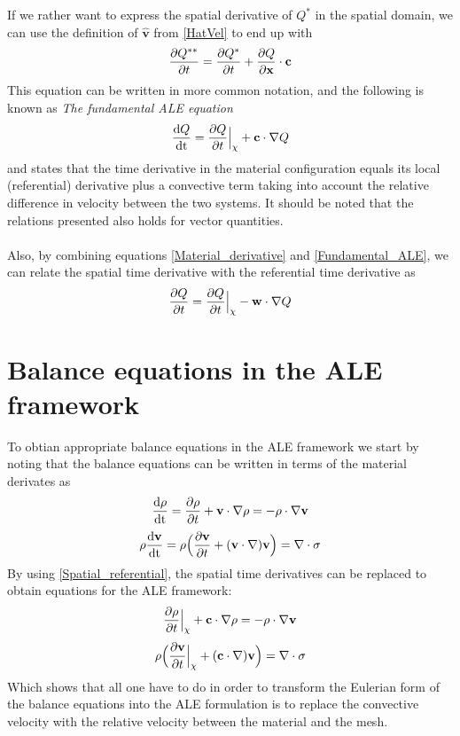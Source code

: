 If we rather want to express the spatial derivative of $Q^*$ in the spatial domain, we can use the definition of $\mathbf{\hat{v}}$ from \eqref{HatVel} to end up with
\begin{align}
\frac{\partial Q^{**}}{\partial t} = \frac{\partial Q^*}{\partial t} + \frac{\partial Q}{\partial \mathbf{x}} \cdot \mathbf{c}
\end{align}
This equation can be written in more common notation, and the following is known as \textit{The fundamental ALE equation}
\begin{align}
\frac{\mathrm{d}Q}{\mathrm{dt}} = \frac{\partial Q}{\partial t}\Big{|}_{\chi} + \mathbf{c} \cdot \nabla Q \label{Fundamental_ALE}
\end{align}
and states that the time derivative in the material configuration equals its local (referential) derivative plus a convective term taking into account the relative difference in velocity between the two systems. It should be noted that the relations presented also holds for vector quantities. 
\\
\\
Also, by combining equations \eqref{Material_derivative} and \eqref{Fundamental_ALE}, we can relate the spatial time derivative with the referential time derivative as
\begin{align}
\frac{\partial Q}{\partial t} = \frac{\partial Q}{\partial t}\Big{|}_{\chi} - \mathbf{w} \cdot \nabla Q \label{Spatial_referential}
\end{align}



\section{Balance equations in the ALE framework}
To obtian appropriate balance equations in the ALE framework we start by noting that the balance equations can be written in terms of the material derivates as
\begin{align}
\frac{\mathrm{d}\rho}{\mathrm{dt}} = \frac{\partial \rho}{\partial t} + \mathbf{v} \cdot \nabla \rho= -  \rho \cdot \nabla \mathbf{v}
\end{align}
\begin{align}
\rho \frac{\mathrm{d}\mathbf{v}}{\mathrm{dt}} = \rho \Big{(} \frac{\partial \mathbf{v}}{\partial t} + (\mathbf{v} \cdot \nabla ) \mathbf{v} \Big{)} = \nabla \cdot \sigma
\end{align}
By using \eqref{Spatial_referential}, the spatial time derivatives can be replaced to obtain equations for the ALE framework:
\begin{align}
\frac{\partial \rho}{\partial t}\Big{|}_\chi + \mathbf{c} \cdot \nabla \rho= -  \rho \cdot \nabla \mathbf{v}
\end{align}
\begin{align}
\rho \Big{(} \frac{\partial \mathbf{v}}{\partial t}\Big{|}_\chi + (\mathbf{c} \cdot \nabla ) \mathbf{v} \Big{)} = \nabla \cdot \sigma
\end{align}
Which shows that all one have to do in order to transform the Eulerian form of the balance equations into the ALE formulation is to replace the convective velocity with the relative velocity between the material and the mesh. 
